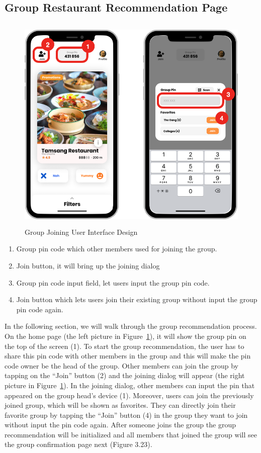 \documentclass[12pt,oneside,openright,a4paper]{cpe-english-project}
\begin{document}
\subsection{Group Restaurant Recommendation Page}
\begin{figure}[H]\centering
\includegraphics[height=300pt]{./images/3ui_GroupJoiningUserInterfaceDesign.png}
\caption{Group Joining User Interface Design}\label{fig:3ui_GroupJoiningUserInterfaceDesign}
\end{figure}
\begin{enumerate}
\item Group pin code which other members used for joining the group.
\item Join button, it will bring up the joining dialog
\item Group pin code input field, let users input the group pin code.
\item Join button which lets users join their existing group without input the group pin code again.
\end{enumerate}
In the following section, we will walk through the group recommendation process. On the home page (the left picture in Figure~\ref{fig:3ui_GroupJoiningUserInterfaceDesign}), it will show the group pin on the top of the screen (1). To start the group recommendation, the user has to share this pin code with other members in the group and this will make the pin code owner be the head of the group. Other members can join the group by tapping on the “Join” button (2) and the joining dialog will appear (the right picture in Figure~\ref{fig:3ui_GroupJoiningUserInterfaceDesign}). In the joining dialog, other members can input the pin that appeared on the group head’s device (1). Moreover, users can join the previously joined group, which will be shown as favorites. They can directly join their favorite group by tapping the “Join” button (4) in the group they want to join without input the pin code again. After someone joins the group the group recommendation will be initialized and all members that joined the group will see the group confirmation page next (Figure 3.23).
\end{document}
